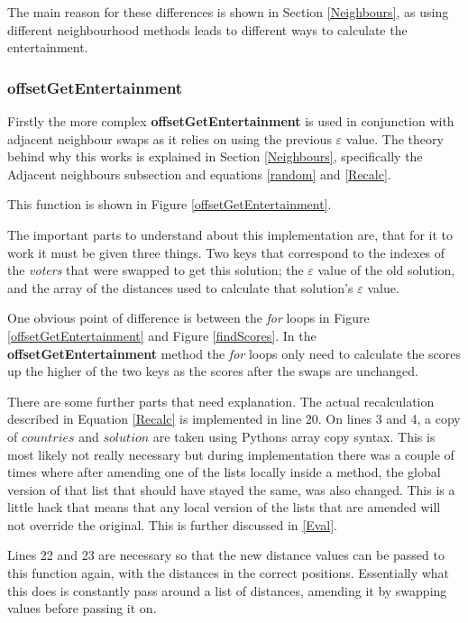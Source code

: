 \documentclass[12pt]{report}
\begin{document}
The main reason for these differences is shown in Section \ref{Neighbours}, as using different neighbourhood methods leads to different ways to calculate the entertainment. 

\subsubsection{offsetGetEntertainment}
Firstly the more complex \textbf{offsetGetEntertainment} is used in conjunction with adjacent neighbour swaps as it relies on using the previous $\varepsilon$ value. The theory behind why this works is explained in Section \ref{Neighbours}, specifically the Adjacent neighbours subsection and equations \ref{random} and \ref{Recalc}.

This function is shown in Figure \ref{offsetGetEntertainment}.

The important parts to understand about this implementation are, that for it to work it must be given three things. Two keys that correspond to the indexes of the \textit{voters} that were swapped to get this solution; the $\varepsilon$ value of the old solution, and the array of the distances used to calculate that solution's $\varepsilon$ value.

One obvious point of difference is between the \textit{for} loops in Figure \ref{offsetGetEntertainment} and Figure \ref{findScores}. In the \textbf{offsetGetEntertainment} method the \textit{for} loops only need to calculate the scores up the higher of the two keys as the scores after the swaps are unchanged.

There are some further parts that need explanation. The actual recalculation described in Equation \ref{Recalc} is implemented in line 20. On lines 3 and 4, a copy of $countries$ and $solution$ are taken using Pythons array copy syntax. This is most likely not really necessary but during implementation there was a couple of times where after amending one of the lists locally inside a method, the global version of that list that should have stayed the same, was also changed. This is a little hack that means that any local version of the lists that are amended will not override the original. This is further discussed in \ref{Eval}.

Lines 22 and 23 are necessary so that the new distance values can be passed to this function again, with the distances in the correct positions. Essentially what this does is constantly pass around a list of distances, amending it by swapping values before passing it on.
\end{document}
